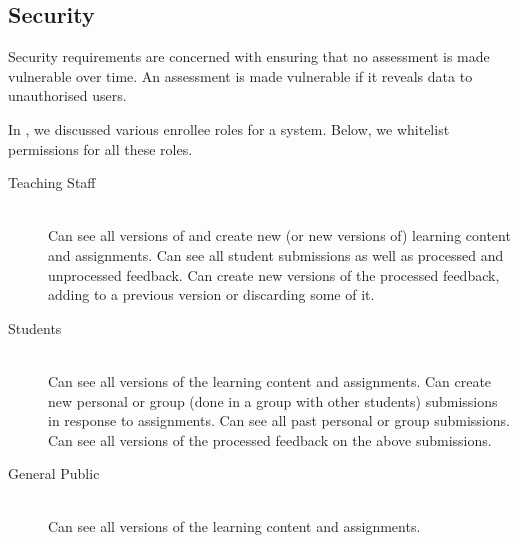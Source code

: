 \subsection{Security}

Security requirements are concerned with ensuring that no assessment is made
vulnerable over time. An assessment is made vulnerable if it reveals data to
unauthorised users.

In \label{section:roles-in-educational-assessment}, we discussed various
enrollee roles for a system.  Below, we whitelist permissions for all these
roles.

\begin{description}

\item[Teaching Staff] \ \\ Can see all versions of and create new (or new
versions of) learning content and assignments.  Can see all student submissions
as well as processed and unprocessed feedback. Can create new versions of the
processed feedback, adding to a previous version or discarding some of it.

\item[Students] \ \\ Can see all versions of the learning content and
assignments.  Can create new personal or group (done in a group with other
students) submissions in response to assignments. Can see all past personal or
group submissions.  Can see all versions of the processed feedback on the above
submissions.

\item[General Public] \ \\ Can see all versions of the learning content and
assignments.

\end{description}
